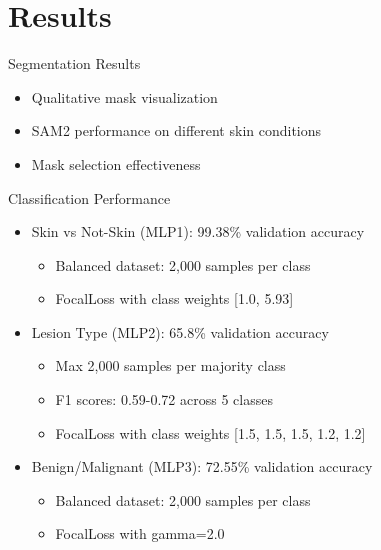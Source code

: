 \documentclass[aspectratio=169]{beamer}
\begin{document}
\section{Results}

\begin{frame}{Segmentation Results}
  \begin{itemize}
    \item Qualitative mask visualization
    \item SAM2 performance on different skin conditions
    \item Mask selection effectiveness
  \end{itemize}
\end{frame}

\begin{frame}{Classification Performance}
  \begin{itemize}
    \item Skin vs Not-Skin (MLP1): 99.38\% validation accuracy
      \begin{itemize}
        \item Balanced dataset: 2,000 samples per class
        \item FocalLoss with class weights [1.0, 5.93]
      \end{itemize}
    \item Lesion Type (MLP2): 65.8\% validation accuracy
      \begin{itemize}
        \item Max 2,000 samples per majority class
        \item F1 scores: 0.59-0.72 across 5 classes
        \item FocalLoss with class weights [1.5, 1.5, 1.5, 1.2, 1.2]
      \end{itemize}
    \item Benign/Malignant (MLP3): 72.55\% validation accuracy
      \begin{itemize}
        \item Balanced dataset: 2,000 samples per class
        \item FocalLoss with gamma=2.0
      \end{itemize}
  \end{itemize}
\end{frame}
\end{document}
